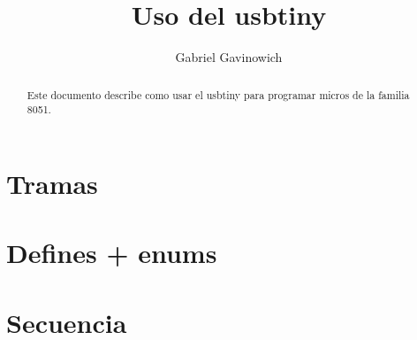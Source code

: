 \documentclass[a4paper,10pt]{article}
\title{Uso del usbtiny}
\author{Gabriel Gavinowich}
\begin{document}
\maketitle
\tableofcontents

\begin{abstract}
Este documento describe como usar el usbtiny para programar micros de la familia 8051.
\end{abstract}

\section{Tramas}

\section{Defines + enums}

\section{Secuencia}
\end{document}
